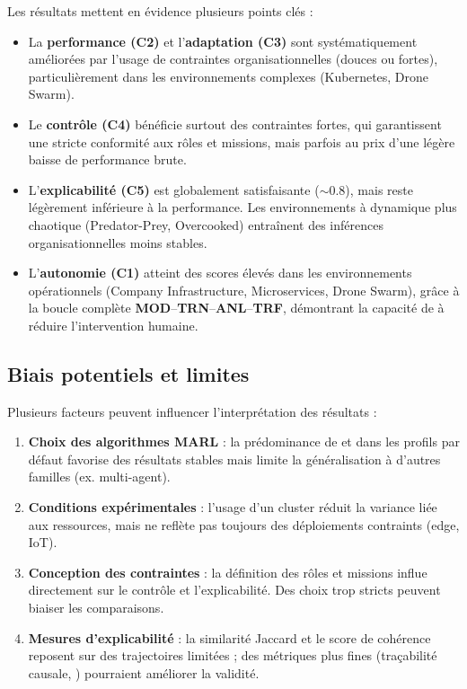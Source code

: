Les résultats mettent en évidence plusieurs points clés :
\begin{itemize}
  \item La \textbf{performance (C2)} et l'\textbf{adaptation (C3)} sont systématiquement améliorées par l'usage de contraintes organisationnelles (douces ou fortes), particulièrement dans les environnements complexes (Kubernetes, Drone Swarm).
  \item Le \textbf{contrôle (C4)} bénéficie surtout des contraintes fortes, qui garantissent une stricte conformité aux rôles et missions, mais parfois au prix d'une légère baisse de performance brute.
  \item L'\textbf{explicabilité (C5)} est globalement satisfaisante ($\sim 0.8$), mais reste légèrement inférieure à la performance. Les environnements à dynamique plus chaotique (Predator-Prey, Overcooked) entraînent des inférences organisationnelles moins stables.
  \item L'\textbf{autonomie (C1)} atteint des scores élevés dans les environnements opérationnels (Company Infrastructure, Microservices, Drone Swarm), grâce à la boucle complète \textbf{MOD}–\textbf{TRN}–\textbf{ANL}–\textbf{TRF}, démontrant la capacité de  à réduire l'intervention humaine.
\end{itemize}

\subsection{Biais potentiels et limites}

Plusieurs facteurs peuvent influencer l'interprétation des résultats :
\begin{enumerate}[label={\alph*)}]
  \item \textbf{Choix des algorithmes MARL} : la prédominance de  et  dans les profils par défaut favorise des résultats stables mais limite la généralisation à d'autres familles (ex.  multi-agent).
  \item \textbf{Conditions expérimentales} : l'usage d'un cluster  réduit la variance liée aux ressources, mais ne reflète pas toujours des déploiements contraints (edge, IoT).
  \item \textbf{Conception des contraintes} : la définition des rôles et missions influe directement sur le contrôle et l'explicabilité. Des choix trop stricts peuvent biaiser les comparaisons.
  \item \textbf{Mesures d'explicabilité} : la similarité Jaccard et le score de cohérence reposent sur des trajectoires limitées ; des métriques plus fines (traçabilité causale, ) pourraient améliorer la validité.
\end{enumerate}


